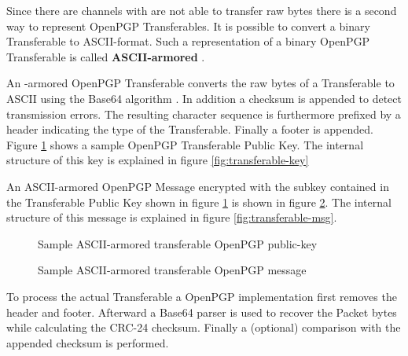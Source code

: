 Since there are channels with are not able to transfer raw bytes there is a second way to represent OpenPGP Transferables. It is possible to convert a binary Transferable to ASCII-format. Such a representation of a binary OpenPGP Transferable is called \textbf{ASCII-armored} \cite[section 6]{RFC4880}.

An -armored OpenPGP Transferable converts the raw bytes of a Transferable to ASCII using the Base64 algorithm \citep{RFC4648}. In addition a  \cite[section 6.1]{RFC4880} checksum is appended to detect transmission errors. The resulting character sequence is furthermore prefixed by a header indicating the type of the Transferable. Finally a footer is appended. \\

Figure \ref{fig:key} shows a sample OpenPGP Transferable Public Key. The internal structure of this key is explained in figure \ref{fig:transferable-key}

An ASCII-armored OpenPGP Message encrypted with the subkey contained in the Transferable Public Key shown in figure \ref{fig:key} is shown in figure \ref{fig:msg}. The internal structure of this message is explained in figure \ref{fig:transferable-msg}. \\

\begin{figure}[p]
	\centering
	
	\caption{Sample ASCII-armored transferable OpenPGP public-key}
	\label{fig:key}
\end{figure}

\begin{figure}[p]
	\centering
	
	\caption{Sample ASCII-armored transferable OpenPGP message}
	\label{fig:msg}
\end{figure}

To process the actual Transferable a OpenPGP implementation first removes the header and footer. Afterward a Base64 parser is used to recover the Packet bytes while calculating the CRC-24 checksum. Finally a (optional) comparison with the appended checksum is performed.





